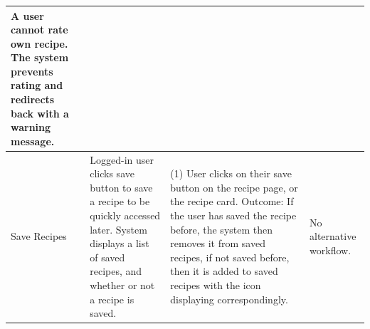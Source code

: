 \documentclass[10pt,a4paper]{article}
\begin{document}
\begin{longtable}{|p{30mm}|p{30mm}|p{40mm}|p{40mm}|}
A user cannot rate own recipe. The system prevents rating and redirects back with a warning message. \\







\hline
Save Recipes
&
Logged-in user clicks save button to save a recipe to be quickly accessed later. System displays a list of saved recipes, and whether or not a recipe is saved.
&
(1) User clicks on their save button on the recipe page, or the recipe card.
Outcome: If the user has saved the recipe before, the system then removes it from saved recipes, if not saved before, then it is added to saved recipes with the icon displaying correspondingly.

&
No alternative workflow. \\






\hline
\end{longtable}
\end{document}
